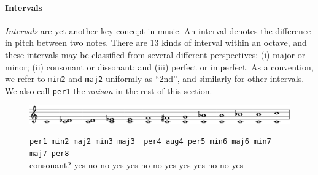 \paragraph{Intervals}

\emph{Intervals} are yet another key concept in music.
An interval denotes the difference in pitch between two notes.
There are 13 kinds of interval within an octave, and these intervals
may be classified from several different perspectives: (i) major or minor;
(ii) consonant or dissonant; and (iii) perfect or imperfect.
As a convention, we refer to \texttt{min2} and \texttt{maj2}  uniformly
as ``2nd'', and similarly for other intervals.
We also call \texttt{per1} the \emph{unison} in the rest of this section.

\begin{figure}[h]
  \includegraphics[width=12cm]{fig/interval.png} \\
  \begin{flushleft}
    \begin{footnotesize}
      \hspace{1.45cm} \texttt{per1 \hspace{0.5mm} min2  \hspace{2.5mm}
        maj2 \hspace{1.2mm} min3 \hspace{0.5mm} maj3 \ per4
        \hspace{1mm}aug4
        \hspace{0.5mm}  per5\hspace{1.2mm}  min6\hspace{1.6mm} maj6
        \hspace{1.6mm}min7\hspace{1.2mm} maj7\hspace{1.2mm} per8} \\
      consonant? \hspace{1.5mm} yes \hspace{4.2mm} no \hspace{6.5mm}  no
      \hspace{4.7mm} yes \hspace{3.8mm}  yes \hspace{3.7mm} no \hspace{3.5mm}
      no \hspace{4.3mm} yes \hspace{3.8mm} yes \hspace{3.2mm} yes
      \hspace{3.7mm} no \hspace{4mm} no \hspace{3.8mm} yes
    \end{footnotesize}
  \end{flushleft}
\end{figure}